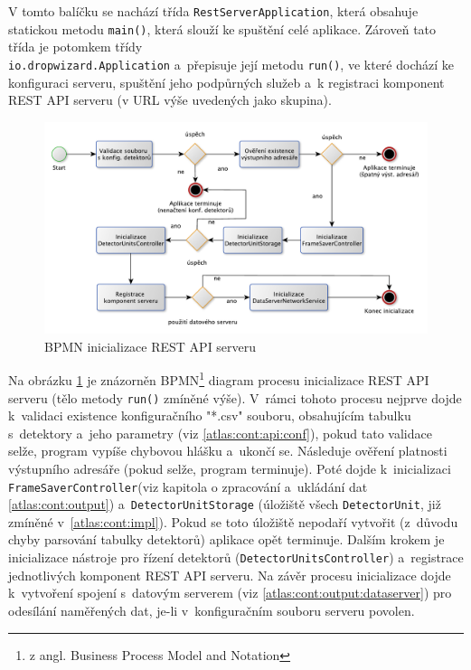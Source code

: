 V tomto balíčku se nachází třída \texttt{RestServerApplication}, která obsahuje statickou metodu \texttt{main()}, která slouží ke spuštění celé aplikace. Zároveň tato třída je potomkem třídy \\\texttt{io.dropwizard.Application} a~přepisuje její metodu \texttt{run()}, ve které dochází ke konfiguraci serveru, spuštění jeho podpůrných služeb a~k registraci komponent REST API serveru (v URL výše uvedených jako skupina).

\begin{figure}[th]
	\begin{center}
		\includegraphics[width=15cm]{figures/atlas_tpx_api_server_init.pdf}
		\caption{BPMN inicializace REST API serveru}
		\label{fig:atlas:apiserver-init}
	\end{center}
\end{figure}

Na obrázku \ref{fig:atlas:apiserver-init} je znázorněn BPMN\footnote{z angl. Business Process Model and Notation} diagram procesu inicializace REST API serveru (tělo metody \texttt{run()} zmíněné výše). V~rámci tohoto procesu nejprve dojde k~validaci existence konfiguračního "*.csv" souboru, obsahujícím tabulku s~detektory a~jeho parametry (viz \ref{atlas:cont:api:conf}), pokud tato validace selže, program vypíše chybovou hlášku a~ukončí se.  Následuje ověření platnosti výstupního adresáře (pokud selže, program terminuje). Poté dojde k~inicializaci \texttt{FrameSaverController}(viz kapitola o zpracování a~ukládání dat \ref{atlas:cont:output}) a~\texttt{DetectorUnitStorage} (úložiště všech \texttt{DetectorUnit}, již zmíněné v~\ref{atlas:cont:impl}). Pokud se toto úložiště nepodaří vytvořit (z~důvodu chyby parsování tabulky detektorů) aplikace opět terminuje. Dalším krokem je inicializace nástroje pro řízení detektorů (\texttt{DetectorUnitsController}) a~registrace jednotlivých komponent REST API serveru. Na závěr procesu inicializace dojde k~vytvoření spojení s~datovým serverem (viz \ref{atlas:cont:output:dataserver}) pro odesílání naměřených dat, je-li v~konfiguračním souboru serveru povolen. 

